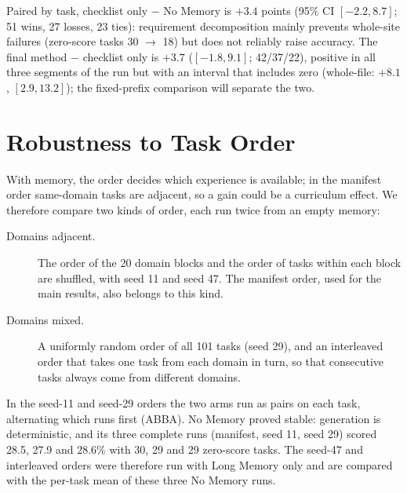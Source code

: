 Paired by task, checklist only $-$ No Memory is $+3.4$ points (95\% CI $[-2.2, 8.7]$; 51 wins, 27 losses, 23 ties): requirement decomposition mainly prevents whole-site failures (zero-score tasks 30 $\to$ 18) but does not reliably raise accuracy. The final method $-$ checklist only is $+3.7$ ($[-1.8, 9.1]$; 42/37/22), positive in all three segments of the run but with an interval that includes zero (whole-file: $+8.1$, $[2.9, 13.2]$); the fixed-prefix comparison will separate the two.


\section{Robustness to Task Order}
\label{sec:order-design}
With memory, the order decides which experience is available; in the manifest order same-domain tasks are adjacent, so a gain could be a curriculum effect. We therefore compare two kinds of order, each run twice from an empty memory:
\begin{description}
  \item[Domains adjacent.] The order of the 20 domain blocks and the order of tasks within each block are shuffled, with seed 11 and seed 47. The manifest order, used for the main results, also belongs to this kind.
  \item[Domains mixed.] A uniformly random order of all 101 tasks (seed 29), and an interleaved order that takes one task from each domain in turn, so that consecutive tasks always come from different domains.
\end{description}
In the seed-11 and seed-29 orders the two arms run as pairs on each task, alternating which runs first (ABBA). No Memory proved stable: generation is deterministic, and its three complete runs (manifest, seed 11, seed 29) scored 28.5, 27.9 and 28.6\% with 30, 29 and 29 zero-score tasks. The seed-47 and interleaved orders were therefore run with Long Memory only and are compared with the per-task mean of these three No Memory runs.

